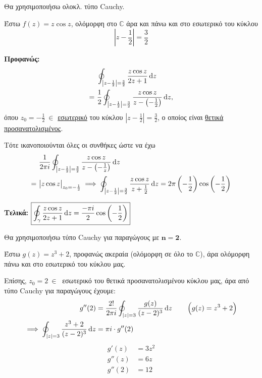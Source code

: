 \documentclass[12pt,a4paper,titlepage,fleqn]{article}
\begin{document}
    \begin{enumgreekparen}
    	\item 
    	Θα χρησιμοποιήσω ολοκλ. τύπο Cauchy.
    	
    	Έστω \( f(z)=z\cos z \), ολόμορφη στο \( \mathbb C  \) άρα και πάνω και στο
    	εσωτερικό του κύκλου \[ \left| z-\frac{1}{2} \right| =\frac{3}{2} \]
    	
    	\textbf{Προφανώς:} \begin{align*}
    		&\ \oint_{\left| z-\frac{1}{2} \right|=\frac{3}{2}}
    		\frac{z\cos z}{2z+1}\dif z \\
    		=&\ \frac{1}{2} \oint_{\left| z-\frac{1}{2} \right|=\frac{3}{2}}
    		\frac{z\cos z}{z-\left(-\frac{1}{2}\right)} \dif z,
    	\end{align*}
    	όπου \( z_0 = -\frac{1}{2} \ \in \) \underline{εσωτερικό} του κύκλου
    	\( \left|z-\frac{1}{2}\right| = \frac{3}{2} \), ο οποίος είναι
    	\underline{θετικά προσανατολισμένος}.
    	
    	Τότε ικανοποιούνται όλες οι συνθήκες ώστε να έχω
    	\begin{align*}
    		&\ \frac{1}{2\pi i}\oint_{\left| z-\frac{1}{2} \right|=\frac{3}{2}}
    		\frac{z\cos z}{z-\left(-\frac{1}{z}\right)}\dif z
    		\\ =&\ \big|z\cos z\big|_{z_0=-\frac{1}{2}} \implies
    		\oint_{\left| z-\frac{1}{2} \right|=\frac{3}{2}} \frac{z\cos z}{z+\frac{1}{2}}
    		\dif z = 2\pi \left(-\frac{1}{2}\right) \cos \left(-\frac{1}{2}\right)
    	\end{align*}
    	
    	\textbf{Τελικά:} \( 
    	\displaystyle \boxed{
    		\oint_\gamma \frac{z\cos z}{2z+1}\dif z = \frac{-\pi i}{2}
    		\cos\left(-\frac{1}{2}\right)
    		}
    	 \)
    	 
    	 \item 
    	 Θα χρησιμοποιήσω τύπο Cauchy για παραγώγους με \( \mathbf{n=2} \).
    	 
    	 Έστω \( g(z) = z^3+2 \), προφανώς ακεραία (ολόμορφη σε όλο το \( \mathbb C  \)),
    	 άρα ολόμορφη πάνω και στο εσωτερικό του κύκλου μας.
    	 
    	 Επίσης, \( z_0 = 2 \ \in \ \) εσωτερικό του θετικά προσανατολισμένου κύκλου
    	 μας, άρα από τύπο Cauchy για παραγώγους έχουμε:
    	 \begin{align*}
    	 g''(2) &= \frac{2!}{2\pi i} \oint_{|z|=3} \frac{g(z)}{(z-2)^3} \dif z
    	 \qquad \left(g(z) = z^3+2 \right) \\
    	 \implies \oint_{|z|=3} \frac{z^3+2}{(z-2)^3} \dif z &= \pi i \cdot g''(2)
    	 \end{align*}
    	 \begin{align*}
    	 	g'(z) &= 3z^2 \\
    	 	g''(z) &= 6z \\
    	 	g''(2) &= 12
    	 \end{align*}
    	 

\end{enumgreekparen}
\end{document}
